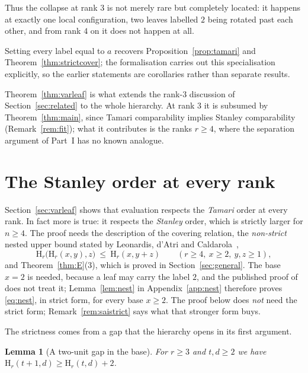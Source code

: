 \documentclass[11pt,a4paper]{article}
\theoremstyle{plain}
\newtheorem{lemma}[theorem]{Lemma}
\theoremstyle{definition}
\newcommand{\HH}{\mathrm{H}}
\begin{document}
Thus the collapse at rank $3$ is not merely rare but completely located: it happens at
exactly one local configuration, two leaves labelled $2$ being rotated past each other,
and from rank $4$ on it does not happen at all.

Setting every label equal to $a$ recovers Proposition~\ref{prop:tamari} and
Theorem~\ref{thm:strictcover}; the formalisation carries out this specialisation
explicitly, so the earlier statements are corollaries rather than separate results.

Theorem~\ref{thm:varleaf} is what extends the rank-$3$ discussion of
Section~\ref{sec:related} to the whole hierarchy. At rank $3$ it is subsumed by
Theorem~\ref{thm:main}, since Tamari comparability implies Stanley comparability
(Remark~\ref{rem:fit}); what it contributes is the ranks $r\ge4$, where the separation
argument of Part~I has no known analogue.
\section{The Stanley order at every rank}\label{sec:stanleyrank}

Section~\ref{sec:varleaf} shows that evaluation respects the \emph{Tamari} order at
every rank. In fact more is true: it respects the \emph{Stanley} order, which is
strictly larger for $n\ge4$. The proof needs the description of the covering relation, the
\emph{non-strict} nested upper bound stated by Leonardis, d'Atri and
Caldarola~\cite[Lemma~4.8]{LdC},
\begin{equation}\label{eq:nest}
  \HH_r\bigl(\HH_r(x,y),z\bigr)\ \le\ \HH_r(x,y+z)
  \qquad(r\ge4,\ x\ge2,\ y,z\ge1),
\end{equation}
and Theorem~\ref{thm:E}(3), which is proved in Section~\ref{sec:general}. The base
$x=2$ is needed, because a leaf may carry the label $2$, and the published proof
of~\cite[Lemma~4.8]{LdC} does not treat it; Lemma~\ref{lem:nest} in
Appendix~\ref{app:nest} therefore proves \eqref{eq:nest}, in strict form, for every base
$x\ge2$. The proof below does \emph{not} need the strict form;
Remark~\ref{rem:saistrict} says what that stronger form buys.

The strictness comes from a gap that the hierarchy opens in its first argument.

\begin{lemma}[A two-unit gap in the base]\label{lem:gap}
For $r\ge3$ and $t,d\ge2$ we have $\HH_r(t+1,d)\ge\HH_r(t,d)+2$.
\end{lemma}
\end{document}
